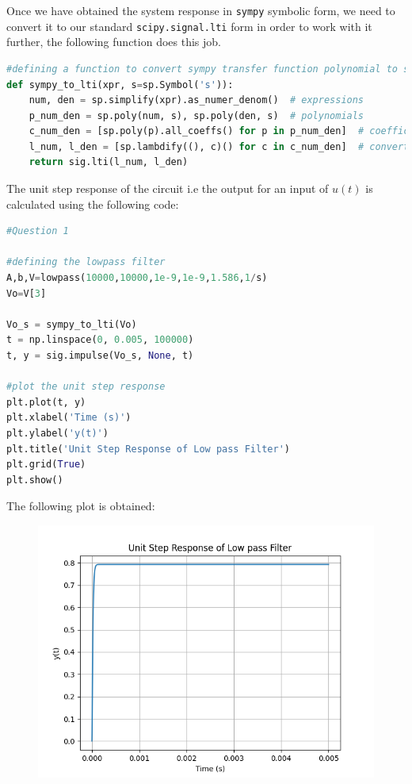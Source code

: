 \documentclass[11pt, a4paper]{article}
\begin{document}
Once we have obtained the system response in \texttt{sympy} symbolic form, we need to convert it to our standard \texttt{scipy.signal.lti} form in order to work with it further, the following function does this job.\\


\begin{lstlisting}[language = Python]
#defining a function to convert sympy transfer function polynomial to scipy lti system
def sympy_to_lti(xpr, s=sp.Symbol('s')):
    num, den = sp.simplify(xpr).as_numer_denom()  # expressions
    p_num_den = sp.poly(num, s), sp.poly(den, s)  # polynomials
    c_num_den = [sp.poly(p).all_coeffs() for p in p_num_den]  # coefficients
    l_num, l_den = [sp.lambdify((), c)() for c in c_num_den]  # convert to floats
    return sig.lti(l_num, l_den)
\end{lstlisting}

The unit step response of the circuit i.e the output for an input of $u(t)$ is calculated using the following code:\\

\begin{lstlisting}[language = Python]
#Question 1

#defining the lowpass filter 
A,b,V=lowpass(10000,10000,1e-9,1e-9,1.586,1/s) 
Vo=V[3]

Vo_s = sympy_to_lti(Vo)
t = np.linspace(0, 0.005, 100000)
t, y = sig.impulse(Vo_s, None, t)

#plot the unit step response
plt.plot(t, y)
plt.xlabel('Time (s)')
plt.ylabel('y(t)')
plt.title('Unit Step Response of Low pass Filter')
plt.grid(True)
plt.show()
\end{lstlisting}

The following plot is obtained:
\begin{figure}[H]
     \centering
     \includegraphics[scale=0.8]{Figure_2.png}
\end{figure}
\end{document}
